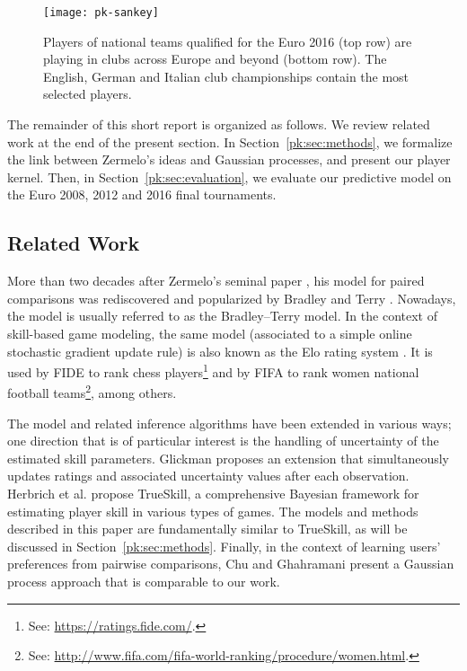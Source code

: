 \begin{figure}[t]
  \centering
  \texttt{[image: pk-sankey]}
  \caption{
  Players of national teams qualified for the Euro 2016 (top row) are playing in clubs across Europe and beyond (bottom row).
  The English, German and Italian club championships contain the most selected players.
}
  \label{pk:fig:sankey}
  \vspace{-0.1cm}
\end{figure}

The remainder of this short report is organized as follows.
We review related work at the end of the present section.
In Section~\ref{pk:sec:methods}, we formalize the link between Zermelo's ideas and Gaussian processes, and present our player kernel.
Then, in Section~\ref{pk:sec:evaluation}, we evaluate our predictive model on the Euro 2008, 2012 and 2016 final tournaments.


\subsection{Related Work}

More than two decades after Zermelo's seminal paper \cite{zermelo1928berechnung}, his model for paired comparisons was rediscovered and popularized by Bradley and Terry \cite{bradley1952rank}.
Nowadays, the model is usually referred to as the Bradley--Terry model.
In the context of skill-based game modeling, the same model (associated to a simple online stochastic gradient update rule) is also known as the Elo rating system \cite{elo1978rating}.
It is used by FIDE to rank chess players\footnote{See: \url{https://ratings.fide.com/}.} and by FIFA to rank women national football teams\footnote{See: \url{http://www.fifa.com/fifa-world-ranking/procedure/women.html}.}, among others.

The model and related inference algorithms have been extended in various ways; one direction that is of particular interest is the handling of uncertainty of the estimated skill parameters.
Glickman \cite{glickman1999parameter} proposes an extension that simultaneously updates ratings and associated uncertainty values after each observation.
Herbrich et al. \cite{herbrich2006trueskill} propose TrueSkill, a comprehensive Bayesian framework for estimating player skill in various types of games.
The models and methods described in this paper are fundamentally similar to TrueSkill, as will be discussed in Section~\ref{pk:sec:methods}.
Finally, in the context of learning users' preferences from pairwise comparisons, Chu and Ghahramani \cite{chu2005preference} present a Gaussian process approach that is comparable to our work.
